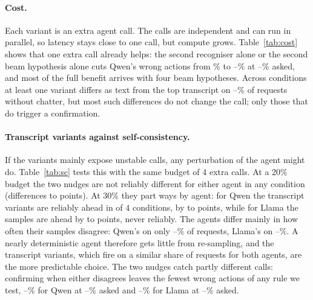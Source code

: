 \documentclass[11pt]{article}
\begin{document}
\paragraph{Cost.} Each variant is an extra agent call. The calls are independent and can run in parallel, so latency stays close to one call, but compute grows. Table~\ref{tab:cost} shows that one extra call already helps: the second recogniser alone or the second beam hypothesis alone cuts Qwen's wrong actions from \HeadNever\% to \CostOneWrongMin--\CostOneWrongMax\% at \CostOneAskedMin--\CostOneAskedMax\% asked, and most of the full benefit arrives with four beam hypotheses. Across conditions at least one variant differs as text from the top transcript on \TextsDifferMin--\TextsDifferMax\% of requests without chatter, but most such differences do not change the call; only those that do trigger a confirmation.

\paragraph{Transcript variants against self-consistency.} If the variants mainly expose unstable calls, any perturbation of the agent might do. Table~\ref{tab:sc} tests this with the same budget of 4 extra calls. At a 20\% budget the two nudges are not reliably different for either agent in any condition (differences \ScDiffMin{} to \ScDiffMax{} points). At 30\% they part ways by agent: for Qwen the transcript variants are reliably ahead in \ScThirtyQwenVarBetter{} of 4 conditions, by \ScThirtyQwenAheadMin{} to \ScThirtyQwenAheadMax{} points, while for Llama the samples are ahead by \ScThirtyLlamaAheadMin{} to \ScThirtyLlamaAheadMax{} points, never reliably. The agents differ mainly in how often their samples disagree: Qwen's on only \QwenSampAskedMin--\QwenSampAskedMax\% of requests, Llama's on \LlamaSampAskedMin--\LlamaSampAskedMax\%. A nearly deterministic agent therefore gets little from re-sampling, and the transcript variants, which fire on a similar share of requests for both agents, are the more predictable choice. The two nudges catch partly different calls: confirming when either disagrees leaves the fewest wrong actions of any rule we test, \QwenBothMin--\QwenBothMax\% for Qwen at \QwenBothAskedMin--\QwenBothAskedMax\% asked and \LlamaBothMin--\LlamaBothMax\% for Llama at \LlamaBothAskedMin--\LlamaBothAskedMax\% asked.
\end{document}
